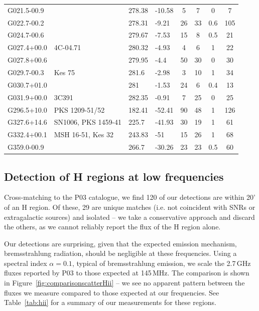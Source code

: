 \documentclass[useAMS,usenatbib]{mn2e}
\begin{document}
\begin{table}
\begin{tabular}{llllcccc}
G021.5-00.9	&		&	278.38	&	-10.58	&	5	&	7	&	0	&	7	\\
G022.7-00.2	&		&	278.31	&	-9.21	&	26	&	33	&	0.6	&	105	\\
G024.7-00.6	&		&	279.67	&	-7.53	&	15	&	8	&	0.5	&	21	\\
G027.4+00.0	&	4C-04.71	&	280.32	&	-4.93	&	4	&	6	&	1	&	22	\\
G027.8+00.6	&		&	279.95	&	-4.4	&	50	&	30	&	0	&	30	\\
G029.7-00.3	&	Kes 75	&	281.6	&	-2.98	&	3	&	10	&	1	&	34	\\
G030.7+01.0	&		&	281	&	-1.53	&	24	&	6	&	0.4	&	13	\\
G031.9+00.0	&	3C391	&	282.35	&	-0.91	&	7	&	25	&	0	&	25	\\
G296.5+10.0	&	PKS 1209-51/52	&	182.41	&	-52.41	&	90	&	48	&	1	&	126	\\
G327.6+14.6	&	SN1006, PKS 1459-41	&	225.7	&	-41.93	&	30	&	19	&	1	&	61	\\
G332.4+00.1	&	MSH 16-51, Kes 32	&	243.83	&	-51	&	15	&	26	&	1	&	68	\\
G359.0-00.9	&		&	266.7	&	-30.26	&	23	&	23	&	0.5	&	60	\\
\hline
\end{tabular}
\label{tab:IGNO}
\end{table}

\subsection{Detection of {H} regions at low frequencies}
\label{subsec:hii}

Cross-matching to the P03 catalogue, we find 120 of our detections are within 20' of an {H} region. Of these, 29 are unique matches (i.e. not coincident with SNRs or extragalactic sources) and isolated -- we take a conservative approach and discard the others, as we cannot reliably report the flux of the {H} region alone. 

Our detections are surprising, given that the expected emission mechanism, bremsstrahlung radiation, should be negligible at these frequencies. Using a spectral index $\alpha=0.1$, typical of bremsstrahlung emission, we scale the 2.7\,GHz fluxes reported by P03 to those expected at 145\,MHz. The comparison is shown in Figure~\ref{fig:comparisonscatterHii} -- we see no apparent pattern between the fluxes we measure compared to those expected at our frequencies. See Table~\ref{tab:hii} for a summary of our measurements for these regions.
\end{document}
